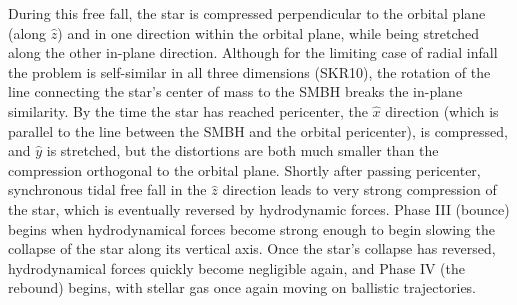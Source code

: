 \documentclass[useAMS, twocolumn, usenatbib]{mn2e}
\begin{document}
During this free fall, the star is compressed perpendicular to the orbital plane (along $\hat{z}$) and in one direction within the orbital plane, while being stretched along the other in-plane direction.  Although for the limiting case of radial infall the problem is self-similar in all three dimensions (SKR10), the rotation of the line connecting the star's center of mass to the SMBH breaks the in-plane similarity.   By the time the star has reached pericenter, the $\hat{x}$ direction (which is parallel to the line between the SMBH and the orbital pericenter), is compressed, and $\hat{y}$ is stretched, but the distortions are both much smaller than the compression orthogonal to the orbital plane.  Shortly after passing pericenter, synchronous tidal free fall in the $\hat{z}$ direction leads to very strong compression of the star, which is eventually reversed by hydrodynamic forces.  Phase III (bounce) begins when hydrodynamical forces become strong enough to begin slowing the collapse of the star along its vertical axis.  Once the star's collapse has reversed, hydrodynamical forces quickly become negligible again, and Phase IV (the rebound) begins, with stellar gas once again moving on ballistic trajectories.
\end{document}
